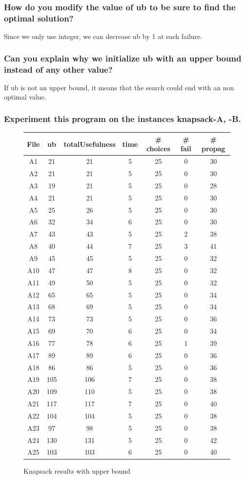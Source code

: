 \documentclass[a4paper ,12pt,french]{article}
\begin{document}
\subsubsection{How do you modify the value of ub to be sure to find the optimal solution?}

Since we only use integer, we can decrease ub by 1 at each failure.

\subsubsection{Can you explain why we initialize ub with an upper bound instead of any other value?}

If ub is not an upper bound, it means that the search could end with an non optimal value.

\subsubsection{Experiment this program on the instances knapsack-A, -B. }




\begin{figure}[!ht]
\begin{tabular}{|c|c|c|c|c|c|c|}     \hline
File & ub & totalUsefulness & time & \# choices & \# fail & \# propag \\ \hline 
A1&21&21&5&25&0&30   \\ \hline
A2&21&21&5&25&0&30   \\ \hline
A3&19&21&5&25&0&28   \\ \hline
A4&21&21&5&25&0&30   \\ \hline
A5&25&26&5&25&0&30   \\ \hline
A6&32&34&6&25&0&30   \\ \hline
A7&43&43&5&25&2&38   \\ \hline
A8&40&44&7&25&3&41   \\ \hline
A9&45&45&5&25&0&32   \\ \hline
A10&47&47&8&25&0&32  \\ \hline
A11&49&50&5&25&0&32  \\ \hline
A12&65&65&5&25&0&34  \\ \hline
A13&68&69&5&25&0&34  \\ \hline
A14&73&73&5&25&0&36  \\ \hline
A15&69&70&6&25&0&34  \\ \hline
A16&77&78&6&25&1&39  \\ \hline
A17&89&89&6&25&0&36  \\ \hline
A18&86&86&5&25&0&36  \\ \hline
A19&105&106&7&25&0&38\\ \hline
A20&109&110&5&25&0&38\\ \hline
A21&117&117&7&25&0&40\\ \hline
A22&104&104&5&25&0&38\\ \hline
A23&97&98&5&25&0&38  \\ \hline
A24&130&131&5&25&0&42\\ \hline
A25&103&103&6&25&0&40\\ \hline
\end{tabular}
\caption{Knapsack results with upper bound}
\label{FIGA}
\end{figure}
\end{document}
